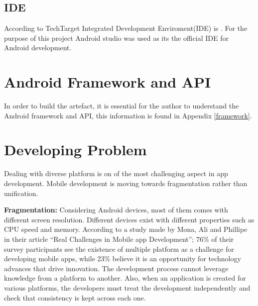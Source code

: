 \subsection{IDE}
According to TechTarget Integrated Development Enviroment(IDE) is .
For the purpose of this project Android studio was used as its the official IDE for Android development.

\section {Android Framework and API}
In order to build the artefact, it is essential for the author to understand the Android framework and API, this information is found in Appendix \ref{framework}.


\section{Developing Problem}
Dealing with diverse platform is on of the most challenging aspect in app development. Mobile development is moving towards fragmentation rather than unification.

\textbf{Fragmentation:} Considering Android devices, most of them comes with different screen resolution. Different devices exist with different properties such as  CPU speed and memory. According to a study made by Mona, Ali and Phillipe in their article “Real Challenges in Mobile app Development”; 76\% of their survey participants see the existence of multiple platform as a challenge for developing mobile apps, while 23\% believe it is an opportunity for technology advances that drive innovation. The development process cannot leverage knowledge from a platform to another. Also, when an application is created for various platforms, the developers must treat the development independently  and check that consistency is kept across each one.
